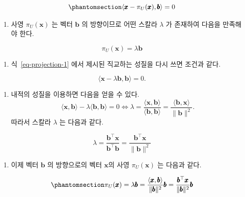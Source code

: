 \documentclass[
  11pt,
  a4paper,
  oneside]{scrbook}
\providecommand{\tightlist}{%
  \setlength{\itemsep}{0pt}\setlength{\parskip}{0pt}}\usepackage{longtable,booktabs,array}
\theoremstyle{definition}
\theoremstyle{definition}
\theoremstyle{plain}
\theoremstyle{remark}
\begin{document}
\begin{equation}\phantomsection\label{eq-projection-1}{
\left\langle\pmb{x}-\pi_U(\pmb{x}), \pmb{b}\right\rangle=0
}\end{equation}

\begin{enumerate}
\def\labelenumi{\arabic{enumi}.}
\setcounter{enumi}{1}
\tightlist
\item
  사영 \(\pi_U(\pmb x)\) 는 벡터 \(\pmb b\) 의 방향이므로 어떤 스칼라
  \(\lambda\) 가 존재하여 다음을 만족해야 한다.
\end{enumerate}

\[
\pi_U(\pmb{x})=\lambda \pmb{b}
\]

\begin{enumerate}
\def\labelenumi{\arabic{enumi}.}
\setcounter{enumi}{2}
\tightlist
\item
  식~\ref{eq-projection-1} 에서 제시된 직교하는 성질을 다시 쓰면 조건과
  같다.
\end{enumerate}

\[
\langle\pmb{x}-\lambda \pmb{b}, \pmb{b}\rangle=0 .
\]

\begin{enumerate}
\def\labelenumi{\arabic{enumi}.}
\setcounter{enumi}{3}
\tightlist
\item
  내적의 성질을 이용하면 다음을 얻을 수 있다. \[
  \langle\pmb{x}, \pmb{b}\rangle-\lambda\langle\pmb{b}, \pmb{b}\rangle=0 \Longleftrightarrow \lambda=\frac{\langle\pmb{x}, \pmb{b}\rangle}{\langle\pmb{b}, \pmb{b}\rangle}=\frac{\langle\pmb{b}, \pmb{x}\rangle}{\|\pmb{b}\|^2} .
  \] 따라서 스칼라 \(\lambda\) 는 다음과 같다.
\end{enumerate}

\[
\lambda=\frac{\pmb{b}^{\top} \pmb{x}}{\pmb{b}^{\top} \pmb{b}}=\frac{\pmb{b}^{\top} \pmb{x}}{\|\pmb{b}\|^2}
\]

\begin{enumerate}
\def\labelenumi{\arabic{enumi}.}
\setcounter{enumi}{4}
\tightlist
\item
  이제 벡터 \(\pmb b\) 의 방향으로의 벡터 \(\pmb x\)의 사영
  \(\pi_U(\pmb x)\) 는 다음과 같다.
\end{enumerate}

\begin{equation}\phantomsection\label{eq-projection-2}{
\pi_U(\pmb{x})=\lambda \pmb{b}=\frac{\langle\pmb{x}, \pmb{b}\rangle}{\|\pmb{b}\|^2} \pmb{b}=\frac{\pmb{b}^{\top} \pmb{x}}{\|\pmb{b}\|^2} \pmb{b}
}\end{equation}
\end{document}
